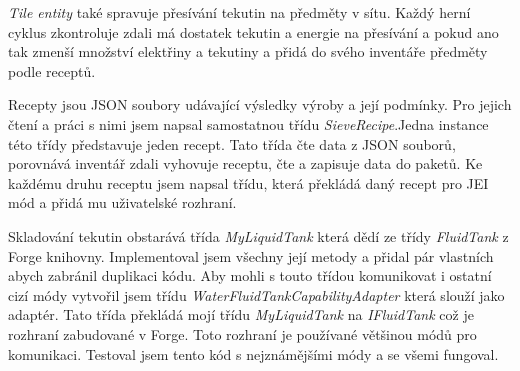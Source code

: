 \documentclass[FM,Proj,bw]{tulthesis}
\begin{document}
\par \textit{Tile entity} také spravuje přesívání tekutin na předměty v sítu. Každý herní cyklus zkontroluje zdali má dostatek tekutin a energie na přesívání a pokud ano tak zmenší množství elektřiny a tekutiny a přidá do svého inventáře předměty podle receptů.
\par Recepty jsou JSON soubory udávající výsledky výroby a její podmínky. Pro jejich čtení a práci s nimi jsem napsal samostatnou třídu \textit{SieveRecipe}.Jedna instance této třídy představuje jeden recept. Tato třída čte data z JSON souborů, porovnává inventář zdali vyhovuje receptu, čte a zapisuje data do paketů. Ke každému druhu receptu jsem napsal třídu, která překládá daný recept pro JEI mód a přidá mu uživatelské rozhraní.
\begin{comment}   
\par    Dále jsem k bloku přidal \textit{tile entity}. Nejprve jsem vytvořil třídu dědící od třídy \textit{TileEntity}. V této třídě jsem přepsal metody k ukládání a načítání dat z nbt. Poté jsem \textit{tile entity} registroval. Při registraci se předá registru constructor pro tileentity a odkaz na všechny registrované bloky kterým tileentity patří. Poté přepíšu ve třídách těch bloků metodu na vrácení \textit{tile entity} a propojení bloku a tile entity je kompletní. 

\par   Dále jsem chtěl aby v\textit{ tile entity} bylo možné vyrábět předměty, k tomu jsem potřeboval recept který bude uvádět co bude potřeba jako vstup do stroje a co vyjde jako výstup. Vytvořil jsem třídu \textit{SieveRecipe} implementující interface \textit{ISieveRecipe}. Tato třída přečte data z JSON souboru a poté vytvoří jednu svoji instanci pro každý úspěšně načtený soubor. Jedna instance této třídy představuje jeden recept. Tato třída obsahuje metody které určí zdali jsou všechny potřebné ingredience a vrátí předmět, který má být vyroben.
\par    Ke každému druhu receptu jsem musel napsat třídu která překládá daný recept pro jei mód a přidat mu UI.
\end{comment}
\par Skladování tekutin obstarává třída \textit{MyLiquidTank} která dědí ze třídy \textit{FluidTank} z Forge knihovny. Implementoval jsem všechny její metody a přidal pár vlastních abych zabránil duplikaci kódu. Aby mohli s touto třídou komunikovat i ostatní cizí módy vytvořil jsem třídu \textit{WaterFluidTankCapabilityAdapter} která slouží jako adaptér. Tato třída překládá mojí třídu  \textit{MyLiquidTank} na \textit{ IFluidTank} což je rozhraní zabudované v Forge. Toto rozhraní je používané většinou módů pro komunikaci. Testoval jsem tento kód s nejznámějšími módy a se všemi fungoval.
\end{document}
